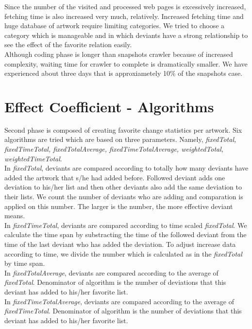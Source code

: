 \documentclass[12pt,a4paper]{report}
\begin{document}
	Since the number of the visited and processed web pages is excessively increased, fetching time is also increased very much, relatively. Increased fetching time and huge database of artwork require limiting categories. We tried to choose a category which is manageable and in which deviants have a strong relationship to see the effect of the favorite relation easily. \\

	Although coding phase is longer than snapshots crawler because of increased complexity, waiting time for crawler to complete is dramatically smaller. We have experienced about three days that is approxiametely 10\% of the snapshots case.


\chapter{Effect Coefficient - Algorithms}

	Second phase is composed of creating favorite change statistics per artwork. Six algorithms are tried which are based on three parameters. Namely, \emph{fixedTotal, fixedTimeTotal, fixedTotalAverage, fixedTimeTotalAverage, weightedTotal, weightedTimeTotal}.\\

	 In \emph{fixedTotal}, deviants are compared according to totally how many deviants have added the artwork that s/he had added before. Followed deviant adds one deviation to his/her list and then other deviants also add the same deviation to their lists. We count the number of deviants who are adding and comparation is applied on this number. The larger is the number, the more effective deviant means. \\

	In \emph{fixedTimeTotal}, deviants are compared according to time scaled \emph{fixedTotal}. We calculate the time span by substracting the time of the followed deviant from the time of the last deviant who has added the deviation. To adjust increase data according to time, we divide the number which is calculated as in the \emph{fixedTotal} by time span. \\


          In \emph{fixedTotalAverage}, deviants are compared according to the average of \emph{fixedTotal}. Denominator of algorithm is the number of deviations that this deviant has added to his/her favorite list.\\

          In \emph{fixedTimeTotalAverage}, deviants are compared according to the average of \emph{fixedTimeTotal}.  Denominator of algorithm is the number of deviations that this deviant has added to his/her favorite list.\\
\end{document}
